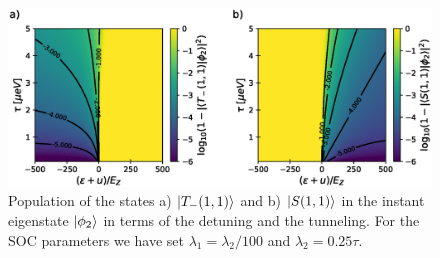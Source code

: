\documentclass[a4paper,11pt]{article}
\begin{document}
\begin{figure}[!htbp]
	\centering
	\includegraphics[width=\linewidth]{limits_FAQUAD.eps}
	\caption{Population of the states a) $\ket{T_-(1,1)}$ and b) $\ket{S(1,1)}$ in the instant eigenstate $\ket{\phi_2}$ in terms of the detuning and the tunneling. For the SOC parameters we have set $\lambda_1=\lambda_2/100$ and $\lambda_2=0.25\tau$.}
	\label{fig:limits_FAQUAD}
\end{figure}

\newpage
\end{document}

